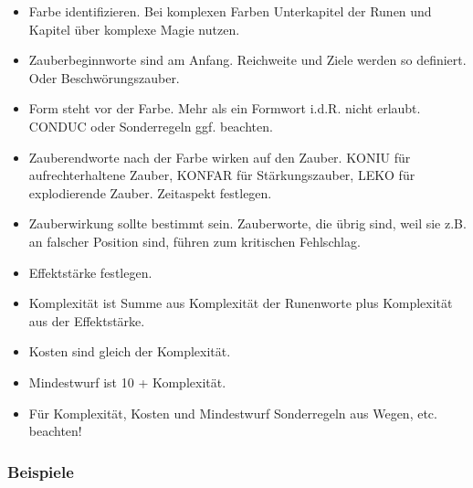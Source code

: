 \documentclass{article}
\begin{document}
\begin{itemize}
\item Farbe identifizieren. Bei komplexen Farben Unterkapitel der Runen und Kapitel über komplexe Magie nutzen.
\item Zauberbeginnworte sind am Anfang. Reichweite und Ziele werden so definiert. Oder Beschwörungszauber.
\item Form steht vor der Farbe. Mehr als ein Formwort i.d.R. nicht erlaubt. CONDUC oder Sonderregeln ggf. beachten.
\item Zauberendworte nach der Farbe wirken auf den Zauber. KONIU für aufrechterhaltene Zauber, KONFAR für Stärkungszauber, LEKO für explodierende Zauber. Zeitaspekt festlegen.
\item Zauberwirkung sollte bestimmt sein. Zauberworte, die übrig sind, weil sie z.B. an falscher Position sind, führen zum kritischen Fehlschlag.
\item Effektstärke festlegen.
\item Komplexität ist Summe aus Komplexität der Runenworte plus Komplexität aus der Effektstärke.
\item Kosten sind gleich der Komplexität.
\item Mindestwurf ist 10 + Komplexität.
\item Für Komplexität, Kosten und Mindestwurf Sonderregeln aus Wegen, etc. beachten!
\end{itemize}

\subsubsection{Beispiele}
\end{document}

